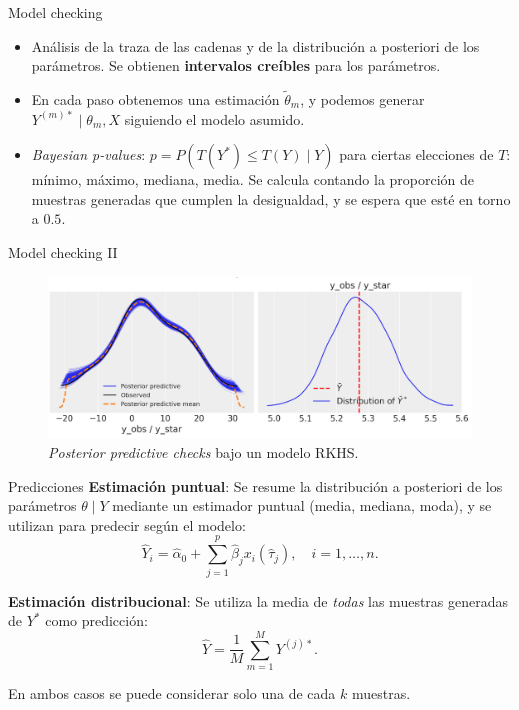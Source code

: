 \documentclass[10pt, spanish, professionalfonts]{beamer}
\begin{document}
\begin{frame}{Model checking}
  \begin{itemize}
    \item Análisis de la traza de las cadenas y de la distribución a posteriori de los parámetros. Se obtienen \textbf{intervalos creíbles} para los parámetros.
    \item En cada paso obtenemos una estimación \(\tilde \theta_m\), y podemos generar \(Y^{(m)*} \mid \theta_m, X\) siguiendo el modelo asumido.
    \item \textit{Bayesian p-values}: \(p=P(T(Y^*)\leq T(Y)\mid Y)\) para ciertas elecciones de \(T\): mínimo, máximo, mediana, media. Se calcula contando la proporción de muestras generadas que cumplen la desigualdad, y se espera que esté en torno a \(0.5\).
  \end{itemize}

\end{frame}

\begin{frame}{Model checking II}
  \begin{figure}
    \includegraphics[width=\textwidth]{img/ppc_lin}
    \caption{\textit{Posterior predictive checks} bajo un modelo RKHS.}
  \end{figure}
\end{frame}

\begin{frame}{Predicciones}
  \textbf{Estimación puntual}: Se resume la distribución a posteriori de los parámetros \(\theta\mid Y\) mediante un estimador puntual (media, mediana, moda), y se utilizan para predecir según el modelo:
  \[
  \hat Y_i =\hat \alpha_0 + \sum_{j=1}^p \hat \beta_j x_i(\hat \tau_j), \quad i=1,\dots, n.
  \]

  \textbf{Estimación distribucional}: Se utiliza la media de \textit{todas}  las muestras generadas de \(Y^*\) como predicción:
  \[
    \hat Y = \frac{1}{M}\sum_{m=1}^M Y^{(j)*}.
  \]

  En ambos casos se puede considerar solo una de cada \(k\) muestras.
\end{frame}
\end{document}
